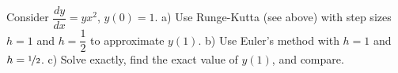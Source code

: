 {Consider $\dfrac{dy}{dx} = yx^2$, $y(0)=1$.
a) Use Runge-Kutta (see above) with step sizes $h=1$ and $h=\dfrac{1}{2}$
to approximate $y(1)$.  b) Use Euler's method with $h=1$ and
$h=\nicefrac{1}{2}$.  c) Solve exactly, find the exact value of
$y(1)$, and compare.}
{}